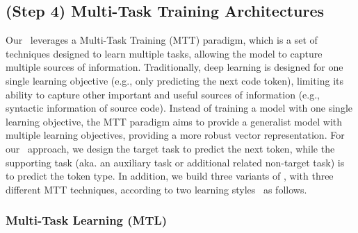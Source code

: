 


\subsection{(Step 4) Multi-Task Training Architectures}
\label{sec:approach-arch}





Our \our~leverages a Multi-Task Training (MTT) paradigm, which is a set of techniques designed to learn multiple tasks, allowing the model to capture multiple sources of information.
Traditionally, deep learning is designed for one single learning objective (e.g., only predicting the next code token), limiting its ability to capture other important and useful sources of information (e.g., syntactic information of source code).
Instead of training a model with one single learning objective, the MTT paradigm aims to provide a generalist model with multiple learning objectives, providing a more robust vector representation.
For our \our~approach, we design the target task to predict the next token, while the supporting task (aka. an auxiliary task or additional related non-target task) is to predict the token type.
In addition, we build three variants of \our, with three different MTT techniques, according to two learning styles~\cite{phang2018sentence} as follows.

\subsubsection{Multi-Task Learning (MTL)}


